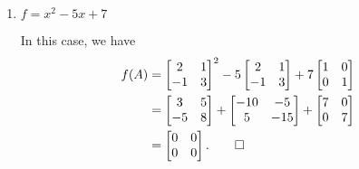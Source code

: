 \begin{enumerate}
\item $f = x^2 - 5x + 7$
  \begin{solution}
    In this case, we have
    \begin{align*}
      f(A)
      &=
      \begin{bmatrix}
        2 & 1 \\
        -1 & 3
      \end{bmatrix}^2
      - 5
      \begin{bmatrix}
        2 & 1 \\
        -1 & 3
      \end{bmatrix}
      + 7
      \begin{bmatrix}
        1 & 0 \\
        0 & 1
      \end{bmatrix} \\
      &=
      \begin{bmatrix}
        3 & 5 \\
        -5 & 8
      \end{bmatrix}
      +
      \begin{bmatrix}
        -10 & -5 \\
        5 & -15
      \end{bmatrix}
      +
      \begin{bmatrix}
        7 & 0 \\
        0 & 7
      \end{bmatrix} \\
      &=
      \begin{bmatrix}
        0 & 0 \\
        0 & 0
      \end{bmatrix}. \qedhere
    \end{align*}
  \end{solution}
\end{enumerate}
